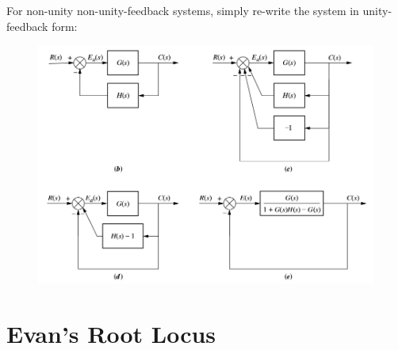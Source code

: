 \documentclass[ 10pt, xcolor = dvipsnames]{beamer}
\begin{document}
\begin{frame}[allowframebreaks]
\frametitle{\insertsection}

For non-unity non-unity-feedback systems, simply re-write the system in unity-feedback form: 
\fullskip

\begin{figure}
\centering
\includegraphics[width=0.7\columnwidth]{figures/Nise_Fig-7-15.jpg}
\end{figure}

\end{frame}

\section{Evan's Root Locus}
\end{document}
